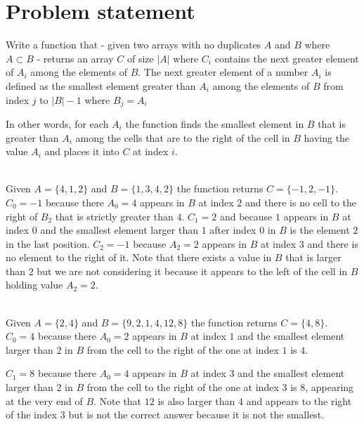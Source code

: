 \section{Problem statement}
\begin{exercise}
\label{example:next_greater_element:exercice1}
Write a function that  - given two arrays with no duplicates $A$ and $B$ where $A \subset B$  - returns an
array $C$ of size $|A|$ where $C_i$ contains the next greater element of $A_i$ among the elements of
$B$. The next greater element of a number $A_i$ is defined as the smallest element greater than
$A_i$ among the elements of $B$ from index $j$ to $|B|-1$ where $B_j = A_i$

In other words, for each $A_i$ the function finds the smallest element in $B$ that is greater than
$A_i$ among the cells that are to the right of the cell in $B$ having the value $A_i$ and places it
into $C$ at index $i$.

	\begin{example}
		\label{example:next_greater_element:example1}
		\hfill \\
		Given $A=\{4,1,2\}$ and $B=\{1,3,4,2\}$ the function returns $C=\{-1,2,-1\}$. $C_0 = -1$
		because there $A_0 = 4$ appears in $B$ at index $2$ and there is no cell to the right of
		$B_2$ that is strictly greater than $4$. $C_1 = 2$ and because $1$ appears in $B$ at index $0$
		and the smallest element larger than $1$ after index $0$ in $B$ is the element $2$ in the
		last position. $C_2 = -1$ because $A_2 = 2$ appears in $B$ at index $3$ and there is no
		element to the right of it. Note that there exists a value in $B$ that is larger than $2$
		but we are not considering it because it appears to the left of the cell in $B$ holding
		value $A_2=2$.
		
	\end{example}

	\begin{example}
		\label{example:next_greater_element:example2}
		\hfill \\
		Given $A=\{2,4\}$ and $B=\{9,2,1,4,12,8\}$ the function returns $C=\{4,8\}$. $C_0 = 4$
		because there $A_0 = 2$ appears in $B$ at index $1$ and the smallest element larger than
		$2$ in $B$ from the cell to the right of the one at index $1$ is $4$.
		
		$C_1 = 8$ because there $A_0 = 4$ appears in $B$ at index $3$ and  the smallest element
		larger than $2$ in $B$ from the cell to the right of the one at index $3$ is $8$, appearing
		at the very end of $B$. Note that $12$ is also larger than $4$ and appears to the right
		of the index $3$ but is not the correct answer because it is not the smallest.
	\end{example}
\end{exercise}

